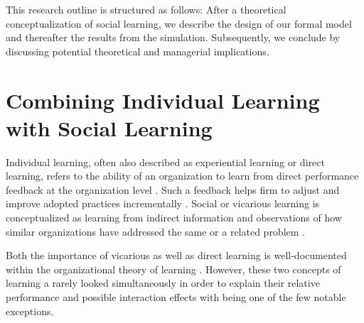 This research outline is structured as follows: After a theoretical conceptualization of social learning, we describe the design of our formal model and thereafter the results from the simulation. Subsequently, we conclude by discussing potential theoretical and managerial implications. 



\section*{Combining Individual Learning with Social Learning}

Individual learning, often also described as experiential learning or direct learning, refers to the ability of an organization to learn from direct performance feedback at the organization level \citep{Schwab2007_Incremental-Organizational-Learning-from-Multilevel-Info_OS}. Such a feedback helps firm to adjust and improve adopted practices incrementally \citep{Greve2003_Organizational-Learning-From-Performance-Feedback, March1991_Exploration-and-Exploitation_OS}. 
Social or vicarious learning is conceptualized as learning from indirect information and observations of how similar organizations have addressed the same or a related problem \citep{BaumLi2000_Making-the-Next-Move:-How-Experiential-and-Vicarious_ASQ, MinerHaunschild1995_Population-level-learning}.

Both the importance of vicarious as well as direct learning is well-documented within the organizational theory of learning 
\citep{BaumLi2000_Making-the-Next-Move:-How-Experiential-and-Vicarious_ASQ, SrinivasanHaunschild2007_Vicarious-Learning-in-New-Product-Introduction_MS, TerlaakGong2008_Vicarious-Learning-and-Inferential-Accuracy-i}. However, these two concepts of learning a rarely looked simultaneously in order to explain their relative performance and possible interaction effects with \citet{Schwab2007_Incremental-Organizational-Learning-from-Multilevel-Info_OS} being one of the few notable exceptions.

